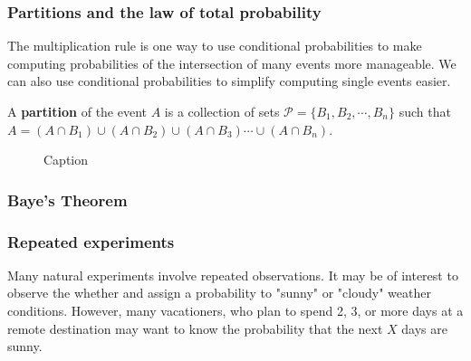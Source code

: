 \subsubsection{Partitions and the law of total probability}

The multiplication rule is one way to use conditional probabilities to make computing probabilities of the intersection of many events more manageable.
We can also use conditional probabilities to simplify computing single events easier.

A \textbf{partition} of the event $A$ is a collection of sets $\mathcal{P} = \{B_{1}, B_{2}, \cdots, B_{n}\}$ such that $A = \left(A \cap B_{1}\right) \cup  \left(A \cap B_{2}\right)  \cup  \left(A \cap B_{3}\right) \cdots  \cup  \left(A \cap B_{n}\right)$.


\begin{figure}[ht!]
    \centering
    \caption{Caption}
    \label{fig:my_label}
\end{figure}


\subsubsection{Baye's Theorem}



\subsubsection{Repeated experiments}
Many natural experiments involve repeated observations. 
It may be of interest to observe the whether and assign a probability to "sunny" or "cloudy" weather conditions. 
However, many vacationers, who plan to spend 2, 3, or more days at a remote destination may want to know the probability that the next $X$ days are sunny. 

